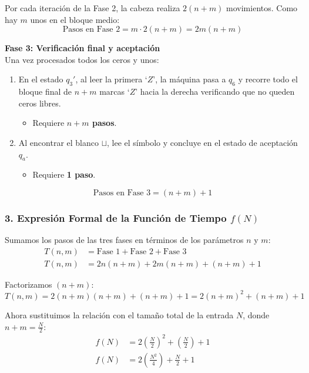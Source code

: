 Por cada iteración de la Fase 2, la cabeza realiza $2(n + m)$ movimientos. Como hay $m$ unos en el bloque medio:
\[\text{Pasos en Fase 2} = m \cdot 2(n + m) = 2m(n + m)\]

\vspace{0.3cm}
\noindent\textbf{Fase 3: Verificación final y aceptación}\\
Una vez procesados todos los ceros y unos:
\begin{enumerate}[label=\arabic*., leftmargin=*]
    \item En el estado $q_3'$, al leer la primera `$Z$', la máquina pasa a $q_6$ y recorre todo el bloque final de $n+m$ marcas `$Z$' hacia la derecha verificando que no queden ceros libres.
    \begin{itemize}[leftmargin=*]
        \item Requiere \textbf{$n + m$ pasos}.
    \end{itemize}
    \item Al encontrar el blanco $\sqcup$, lee el símbolo y concluye en el estado de aceptación $q_a$.
    \begin{itemize}[leftmargin=*]
        \item Requiere \textbf{1 paso}.
    \end{itemize}
\end{enumerate}

\[\text{Pasos en Fase 3} = (n + m) + 1\]

\subsubsection*{3. Expresión Formal de la Función de Tiempo $f(N)$}

Sumamos los pasos de las tres fases en términos de los parámetros $n$ y $m$:
\begin{align*}
    T(n, m) &= \text{Fase 1} + \text{Fase 2} + \text{Fase 3} \\
    T(n, m) &= 2n(n + m) + 2m(n + m) + (n + m) + 1
\end{align*}

Factorizamos $(n + m)$:
\[T(n, m) = 2(n + m)(n + m) + (n + m) + 1 = 2(n + m)^2 + (n + m) + 1\]

Ahora sustituimos la relación con el tamaño total de la entrada $N$, donde $n + m = \frac{N}{2}$:
\begin{align*}
    f(N) &= 2\left(\frac{N}{2}\right)^2 + \left(\frac{N}{2}\right) + 1 \\
    f(N) &= 2 \left(\frac{N^2}{4}\right) + \frac{N}{2} + 1
\end{align*}

